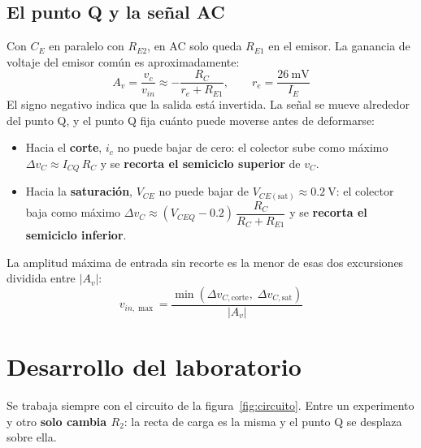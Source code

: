 \documentclass[11pt,a4paper]{article}
\begin{document}
\subsection{El punto Q y la señal AC}
Con $C_E$ en paralelo con $R_{E2}$, en AC solo queda $R_{E1}$ en el emisor. La ganancia de
voltaje del emisor común es aproximadamente:
\begin{equation}
  A_v = \frac{v_c}{v_{in}} \approx -\frac{R_C}{r_e + R_{E1}},
  \qquad
  r_e = \frac{\qty{26}{\milli\volt}}{I_E}
  \label{eq:ganancia}
\end{equation}
El signo negativo indica que la salida está invertida. La señal se mueve alrededor del
punto Q, y el punto Q fija cuánto puede moverse antes de deformarse:
\begin{itemize}
  \item Hacia el \textbf{corte}, $i_c$ no puede bajar de cero: el colector sube como máximo
        $\Delta v_C \approx I_{CQ}\,R_C$ y se \textbf{recorta el semiciclo superior} de
        $v_C$.
  \item Hacia la \textbf{saturación}, $V_{CE}$ no puede bajar de
        $V_{CE(\text{sat})}\approx\qty{0.2}{\volt}$: el colector baja como máximo
        $\Delta v_C \approx (V_{CEQ} - 0.2)\,\dfrac{R_C}{R_C + R_{E1}}$ y se
        \textbf{recorta el semiciclo inferior}.
\end{itemize}
La amplitud máxima de entrada sin recorte es la menor de esas dos excursiones dividida entre
$|A_v|$:
\begin{equation}
  v_{in,\max} = \frac{\min\!\left(\Delta v_{C,\text{corte}},\;\Delta v_{C,\text{sat}}\right)}{|A_v|}
  \label{eq:vinmax}
\end{equation}

\FloatBarrier
{}
\section{Desarrollo del laboratorio}
Se trabaja siempre con el circuito de la figura~\ref{fig:circuito}. Entre un experimento y otro
\textbf{solo cambia $R_2$}: la recta de carga es la misma y el punto Q se desplaza sobre
ella.
\end{document}
